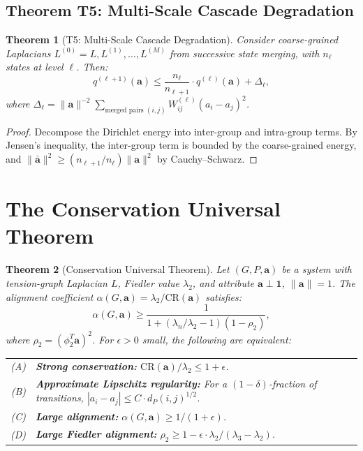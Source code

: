 \documentclass[12pt,letterpaper]{article}
\newtheorem{theorem}{Theorem}[section]
\newcommand{\One}{\mathbf{1}}
\newcommand{\bfa}{\mathbf{a}}
\newcommand{\CR}{\mathrm{CR}}
\begin{document}
\subsection{Theorem T5: Multi-Scale Cascade Degradation}

\begin{theorem}[T5: Multi-Scale Cascade Degradation]
\label{thm:T5}
Consider coarse-grained Laplacians $L^{(0)} = L, L^{(1)}, \ldots, L^{(M)}$ from successive state merging, with $n_\ell$ states at level $\ell$. Then:
\begin{equation}
\label{eq:T5}
  q^{(\ell+1)}(\bfa) \leq \frac{n_\ell}{n_{\ell+1}} \cdot q^{(\ell)}(\bfa) + \Delta_\ell,
\end{equation}
where $\Delta_\ell = \|\bfa\|^{-2}\sum_{\text{merged pairs } (i,j)} W_{ij}^{(\ell)} (a_i - a_j)^2$.
\end{theorem}

\begin{proof}
Decompose the Dirichlet energy into inter-group and intra-group terms. By Jensen's inequality, the inter-group term is bounded by the coarse-grained energy, and $\|\bar{\bfa}\|^2 \geq (n_{\ell+1}/n_\ell)\|\bfa\|^2$ by Cauchy--Schwarz.
\end{proof}

\section{The Conservation Universal Theorem}
\label{sec:universal}

\begin{theorem}[Conservation Universal Theorem]
\label{thm:universal}
Let $(G, P, \bfa)$ be a system with tension-graph Laplacian $L$, Fiedler value $\lambda_2$, and attribute $\bfa \perp \One$, $\|\bfa\| = 1$. The alignment coefficient $\alpha(G, \bfa) = \lambda_2/\CR(\bfa)$ satisfies:
\begin{equation}
\label{eq:fundamental}
  \alpha(G, \bfa) \geq \frac{1}{1 + (\lambda_n/\lambda_2 - 1)(1 - \rho_2)},
\end{equation}
where $\rho_2 = (\phi_2^T \bfa)^2$. For $\epsilon > 0$ small, the following are equivalent:

\medskip
\begin{tabular}{rp{}}
(A) & \textbf{Strong conservation:} $\CR(\bfa)/\lambda_2 \leq 1 + \epsilon$. \\
(B) & \textbf{Approximate Lipschitz regularity:} For a $(1-\delta)$-fraction of transitions, $|a_i - a_j| \leq C \cdot d_P(i,j)^{1/2}$. \\
(C) & \textbf{Large alignment:} $\alpha(G, \bfa) \geq 1/(1+\epsilon)$. \\
(D) & \textbf{Large Fiedler alignment:} $\rho_2 \geq 1 - \epsilon \cdot \lambda_2/(\lambda_3 - \lambda_2)$.
\end{tabular}
\end{theorem}
\end{document}
